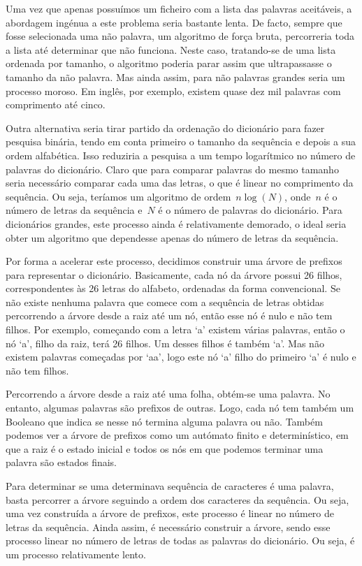 \documentclass[12pt,a4paper,reqno]{report}
\numberwithin{equation}{section}
\begin{document}
Uma vez que apenas possuímos um ficheiro com a lista das palavras aceitáveis, a abordagem ingénua a este problema seria bastante lenta. De facto, sempre que fosse selecionada uma não palavra, um algoritmo de força bruta, percorreria toda a lista até determinar que não funciona. Neste caso, tratando-se de uma lista ordenada por tamanho, o algoritmo poderia parar assim que ultrapassasse o tamanho da não palavra. Mas ainda assim, para não palavras grandes seria um processo moroso. Em inglês, por exemplo, existem quase dez mil palavras com comprimento até cinco.

Outra alternativa seria tirar partido da ordenação do dicionário para fazer pesquisa binária, tendo em conta primeiro o tamanho da sequência e depois a sua ordem alfabética. Isso reduziria a pesquisa a um tempo logarítmico no número de palavras do dicionário. Claro que para comparar palavras do mesmo tamanho seria necessário comparar cada uma das letras, o que é linear no comprimento da sequência. Ou seja, teríamos um algoritmo de ordem~$n\log(N)$, onde~$n$ é o número de letras da sequência e~$N$ é o número de palavras do dicionário. Para dicionários grandes, este processo ainda é relativamente demorado, o ideal seria obter um algoritmo que dependesse apenas do número de letras da sequência.

Por forma a acelerar este processo, decidimos construir uma árvore de prefixos para representar o dicionário. Basicamente, cada nó da árvore possui 26 filhos, correspondentes às 26 letras do alfabeto, ordenadas da forma convencional. Se não existe nenhuma palavra que comece com a sequência de letras obtidas percorrendo a árvore desde a raiz até um nó, então esse nó é nulo e não tem filhos. Por exemplo, começando com a letra `a' existem várias palavras, então o nó `a', filho da raiz, terá 26 filhos. Um desses filhos é também `a'. Mas não existem palavras começadas por `aa', logo este nó `a' filho do primeiro `a' é nulo e não tem filhos.

Percorrendo a árvore desde a raiz até uma folha, obtém-se uma palavra. No entanto, algumas palavras são prefixos de outras. Logo, cada nó tem também um Booleano que indica se nesse nó termina alguma palavra ou não. Também podemos ver a árvore de prefixos como um autómato finito e determinístico, em que a raiz é o estado inicial e todos os nós em que podemos terminar uma palavra são estados finais.  

Para determinar se uma determinava sequência de caracteres é uma palavra, basta percorrer a árvore seguindo a ordem dos caracteres da sequência. Ou seja, uma vez construída a árvore de prefixos, este processo é linear no número de letras da sequência. Ainda assim, é necessário construir a árvore, sendo esse processo linear no número de letras de todas as palavras do dicionário. Ou seja, é um processo relativamente lento. 
\end{document}
